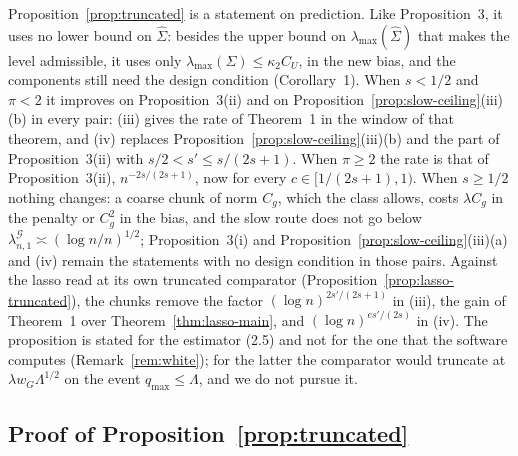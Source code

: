 \documentclass[10pt]{book}
\theoremstyle{definition}
\newcommand{\Gram}{\Sigma}
\newcommand{\Gramhat}{\widehat{\Sigma}}
\newcommand{\pen}{\lambda}
\newcommand{\seff}{s'}
\newcommand{\lmaxx}{\lambda_{\max}}
\newcommand{\lamGone}{\lambda^{\mathcal{G}}_{n,1}}
\begin{document}
{Proposition~\ref{prop:truncated} is a statement on prediction. Like
Proposition~3, it uses no lower bound on $\Gramhat$: besides the upper bound
on $\lmaxx(\Gramhat)$ that makes the level admissible, it uses only
$\lmaxx(\Gram) \le \kappa_2C_U$, in the new bias, and the components still
need the design condition (Corollary~1). When $s < 1/2$ and $\pi < 2$ it
improves on Proposition~3(ii) and on Proposition~\ref{prop:slow-ceiling}(iii)(b)
in every pair: (iii) gives the rate of Theorem~1 in the window of that
theorem, and (iv) replaces Proposition~\ref{prop:slow-ceiling}(iii)(b) and the
part of Proposition~3(ii) with $s/2 < \seff \le s/(2s+1)$. When $\pi \ge 2$
the rate is that of Proposition~3(ii), $n^{-2s/(2s+1)}$, now for every
$c \in [1/(2s+1),1)$. When $s \ge 1/2$ nothing changes: a coarse chunk of
norm $C_g$, which the class allows, costs $\pen C_g$ in the penalty or $C_g^{2}$ in the bias, and
the slow route does not go below $\lamGone \asymp (\log n/n)^{1/2}$;
Proposition~3(i) and Proposition~\ref{prop:slow-ceiling}(iii)(a) and (iv)
remain the statements with no design condition in those pairs. Against the
lasso read at its own truncated comparator
(Proposition~\ref{prop:lasso-truncated}), the chunks remove the factor
$(\log n)^{2\seff/(2s+1)}$ in (iii), the gain of Theorem~1 over
Theorem~\ref{thm:lasso-main}, and $(\log n)^{e\seff/(2s)}$ in (iv). The
proposition is stated for the estimator (2.5) and not for the one that the
software computes (Remark~\ref{rem:white}); for the latter the comparator
would truncate at $\pen w_{G}\Lambda^{1/2}$ on the event $q_{\max} \le \Lambda$,
and we do not pursue it.

\subsection*{Proof of Proposition~\ref{prop:truncated}}

}
\end{document}
